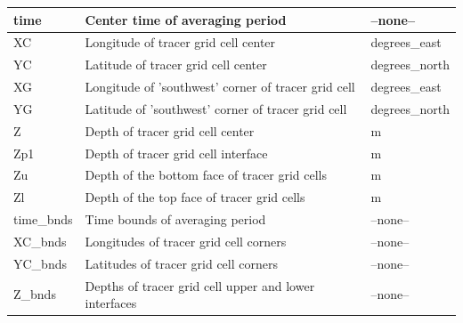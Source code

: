 \begin{longtable}{|m{}|m{}|m{}|}
time &Center time of averaging period &--none--  \\ \hline
XC &Longitude of tracer grid cell center &degrees\_east  \\ \hline
YC &Latitude of tracer grid cell center &degrees\_north  \\ \hline
XG &Longitude of 'southwest' corner of tracer grid cell &degrees\_east  \\ \hline
YG &Latitude of 'southwest' corner of tracer grid cell &degrees\_north  \\ \hline
Z &Depth of tracer grid cell center &m  \\ \hline
Zp1 &Depth of tracer grid cell interface &m  \\ \hline
Zu &Depth of the bottom face of tracer grid cells &m  \\ \hline
Zl &Depth of the top face of tracer grid cells &m  \\ \hline
time\_bnds &Time bounds of averaging period &--none--  \\ \hline
XC\_bnds &Longitudes of tracer grid cell corners &--none--  \\ \hline
YC\_bnds &Latitudes of tracer grid cell corners &--none--  \\ \hline
Z\_bnds &Depths of tracer grid cell upper and lower interfaces &--none--  \\ \hline
\end{longtable}

\newp
\pagebreak
